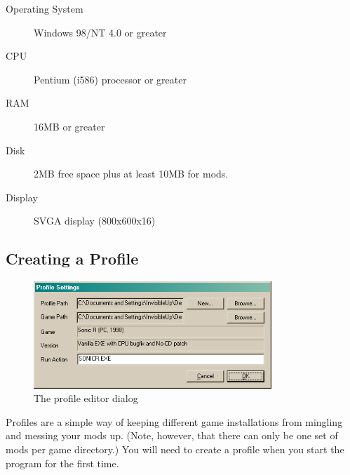 \documentclass[12pt,a4paper,notitlepage]{article}
\begin{document}
\begin{description}
    \item[Operating System] Windows 98/NT 4.0 or greater
    \item[CPU] Pentium (i586) processor or greater
    \item[RAM] 16MB or greater
    \item[Disk] 2MB free space plus at least 10MB for mods.
    \item[Display] SVGA display (800x600x16)
\end{description}


\subsection{Creating a Profile}
\label{subsec:using-profile}

\begin{figure}[h]
    \centering
    \includegraphics[width=0.8\textwidth]{profile.png}
    \caption{The profile editor dialog}
    \label{fig:profile}
\end{figure}

Profiles are a simple way of keeping different game installations from mingling and messing your mods up. (Note, however, that there can only be one set of mods per game directory.)  You will need to create a profile when you start the program for the first time. 
\end{document}
